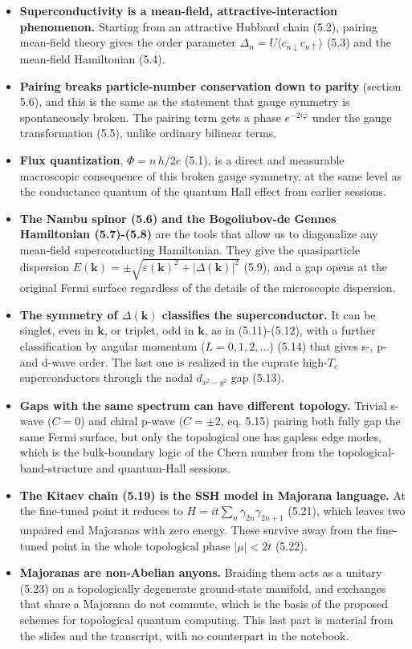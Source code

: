 \begin{itemize}
\item \textbf{Superconductivity is a mean-field, attractive-interaction phenomenon.} Starting from an
attractive Hubbard chain (5.2), pairing mean-field theory gives the order parameter
$\Delta_n = U\langle c_{n\downarrow}c_{n\uparrow}\rangle$ (5.3) and the mean-field Hamiltonian
(5.4).
\item \textbf{Pairing breaks particle-number conservation down to parity} (section 5.6), and this is
the same as the statement that gauge symmetry is spontaneously broken. The pairing term gets a phase
$e^{-2i\varphi}$ under the gauge transformation (5.5), unlike ordinary bilinear terms.
\item \textbf{Flux quantization}, $\Phi = n\, h/2e$ (5.1), is a direct and measurable macroscopic
consequence of this broken gauge symmetry, at the same level as the conductance quantum of the
quantum Hall effect from earlier sessions.
\item \textbf{The Nambu spinor (5.6) and the Bogoliubov-de Gennes Hamiltonian (5.7)-(5.8)} are the
tools that allow us to diagonalize any mean-field superconducting Hamiltonian. They give the
quasiparticle dispersion
$E(\mathbf k) = \pm\sqrt{\varepsilon(\mathbf k)^2 + |\Delta(\mathbf k)|^2}$ (5.9), and a gap opens at
the original Fermi surface regardless of the details of the microscopic dispersion.
\item \textbf{The symmetry of $\Delta(\mathbf k)$ classifies the superconductor.} It can be singlet,
even in $\mathbf
k$, or triplet, odd in $\mathbf k$, as in (5.11)-(5.12), with a further classification by angular
momentum ($L=0,1,2,\dots$) (5.14) that gives s-, p- and d-wave order. The last one is realized in
the cuprate high-$T_c$ superconductors through the nodal $d_{x^2-y^2}$ gap (5.13).
\item \textbf{Gaps with the same spectrum can have different topology.} Trivial s-wave ($C=0$) and
chiral p-wave ($C=\pm2$, eq. 5.15) pairing both fully gap the same Fermi surface, but only the
topological one has gapless edge modes, which is the bulk-boundary logic of the Chern number from
the topological-band-structure and quantum-Hall sessions.
\item \textbf{The Kitaev chain (5.19) is the SSH model in Majorana language.} At the fine-tuned
point it reduces to $H = it\sum_n \gamma_{2n}\gamma_{2n+1}$ (5.21), which leaves two unpaired end
Majoranas with zero energy. These survive away from the fine-tuned point in the whole topological
phase $|\mu|<2t$ (5.22).
\item \textbf{Majoranas are non-Abelian anyons.} Braiding them acts as a unitary (5.23) on a
topologically degenerate ground-state manifold, and exchanges that share a Majorana do not commute, which is the basis of
the proposed schemes for topological quantum computing. This last part is material from the slides
and the transcript, with no counterpart in the notebook.
\end{itemize}

